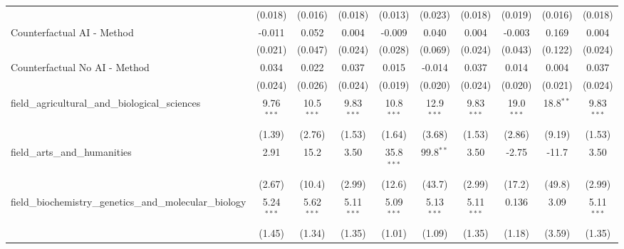 \begin{tabular}{lccccccccc}
                                                               & (0.018)       & (0.016)       & (0.018)       & (0.013)       & (0.023)       & (0.018)       & (0.019)       & (0.016)       & (0.018)\\   
   Counterfactual AI - Method                                  & -0.011        & 0.052         & 0.004         & -0.009        & 0.040         & 0.004         & -0.003        & 0.169         & 0.004\\   
                                                               & (0.021)       & (0.047)       & (0.024)       & (0.028)       & (0.069)       & (0.024)       & (0.043)       & (0.122)       & (0.024)\\   
   Counterfactual No AI - Method                               & 0.034         & 0.022         & 0.037         & 0.015         & -0.014        & 0.037         & 0.014         & 0.004         & 0.037\\   
                                                               & (0.024)       & (0.026)       & (0.024)       & (0.019)       & (0.020)       & (0.024)       & (0.020)       & (0.021)       & (0.024)\\   
   field\_agricultural\_and\_biological\_sciences              & 9.76$^{***}$  & 10.5$^{***}$  & 9.83$^{***}$  & 10.8$^{***}$  & 12.9$^{***}$  & 9.83$^{***}$  & 19.0$^{***}$  & 18.8$^{**}$   & 9.83$^{***}$\\   
                                                               & (1.39)        & (2.76)        & (1.53)        & (1.64)        & (3.68)        & (1.53)        & (2.86)        & (9.19)        & (1.53)\\   
   field\_arts\_and\_humanities                                & 2.91          & 15.2          & 3.50          & 35.8$^{***}$  & 99.8$^{**}$   & 3.50          & -2.75         & -11.7         & 3.50\\   
                                                               & (2.67)        & (10.4)        & (2.99)        & (12.6)        & (43.7)        & (2.99)        & (17.2)        & (49.8)        & (2.99)\\   
   field\_biochemistry\_genetics\_and\_molecular\_biology      & 5.24$^{***}$  & 5.62$^{***}$  & 5.11$^{***}$  & 5.09$^{***}$  & 5.13$^{***}$  & 5.11$^{***}$  & 0.136         & 3.09          & 5.11$^{***}$\\   
                                                               & (1.45)        & (1.34)        & (1.35)        & (1.01)        & (1.09)        & (1.35)        & (1.18)        & (3.59)        & (1.35)\\   

\end{tabular}
